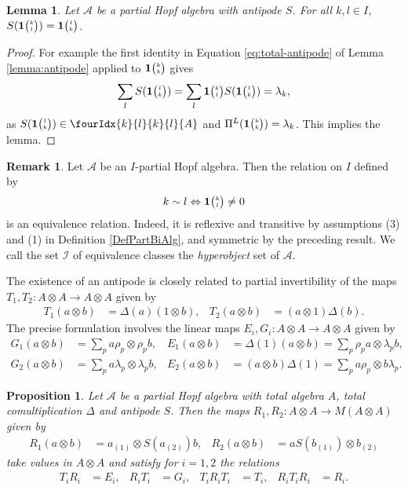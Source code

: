 \documentclass[11pt]{article}
\newcommand{\Grt}[3]{#1{\tiny {\begin{pmatrix} #2\\#3\end{pmatrix}}}}
\newcommand{\UnitC}[2]{\Grt{\mathbf{1}}{#1}{#2}}
\newcommand{\Gr}[5]{\fourIdx{#2}{#4}{#3}{#5}{#1}}%
\newtheorem{Lem}[Theorem]{Lemma}
\newtheorem{Prop}[Theorem]{Proposition}
\theoremstyle{definition}
\newtheorem{Rem}[Theorem]{Remark}
\numberwithin{equation}{section}
\begin{document}
\begin{Lem}\label{LemAntiUnit} Let $\mathscr{A}$ be a partial Hopf algebra with antipode $S$. For all $k,l\in I$, $S(\UnitC{k}{l}) = \UnitC{l}{k}$.
\end{Lem}
\begin{proof} For example the first identity in Equation \eqref{eq:total-antipode} of Lemma \ref{lemma:antipode} applied to $\UnitC{k}{k}$ gives \[\sum_l S(\UnitC{l}{k}) = \sum_l \UnitC{k}{l}S(\UnitC{l}{k}) = \lambda_k,\] as $S(\UnitC{l}{k}) \in \Gr{A}{k}{k}{l}{l}$ and $\Pi^{L}(\UnitC{k}{k}) = \lambda_k$. This implies the lemma.
\end{proof} 
\begin{Rem} \label{remark:index-equivalence}
  Let $\mathscr{A}$ be an $I$-partial Hopf algebra. Then the relation
  on $I$ defined by
  \begin{align*}
    k \sim l \Leftrightarrow \UnitC{k}{l} \neq 0
  \end{align*}
is an equivalence relation. Indeed, it is reflexive and transitive by
assumptions (3) and (1) in Definition \ref{DefPartBiAlg}, and
symmetric by the preceding result. We call the set $\mathscr{I}$ of equivalence classes the \emph{hyperobject} set of $\mathscr{A}$. %
\end{Rem}
The existence of an antipode is closely related to partial invertibility of
the maps $T_{1},T_{2} \colon A \otimes A \to A\otimes A$ given by
\begin{align} \label{eq:wt-12}
  T_{1} (a\otimes b)&= \Delta(a)(1 \otimes b), &
  T_{2} (a\otimes b)&= (a \otimes 1)\Delta(b).
 \end{align}
The precise formulation involves the linear maps $E_{i},G_{i}
 \colon A\otimes A\to A\otimes A$ given by
\begin{align} \label{eq:e1g1}
  G_{1}(a\otimes b) &=
 \sum_{p} a\rho_{p} \otimes \rho_{p}b, &  E_{1}(a \otimes b) &=\Delta(1)(a\otimes b)=\sum_{p} \rho_{p}a\otimes \lambda_{p}b, \\ \label{eq:e2g2}
 G_{2}(a \otimes b) &= \sum_{p} a\lambda_{p} \otimes
    \lambda_{p}b, &
E_{2}(a\otimes b) &= (a\otimes b)\Delta(1)=\sum_{p} a\rho_{p} \otimes b\lambda_{p}.
\end{align}
\begin{Prop} \label{prop:riti}
  Let $\mathscr{A}$ be a partial Hopf algebra with total algebra $A$,
  total comultiplication $\Delta$ and antipode  $S$. Then the maps
  $R_{1},R_{2} \colon A \otimes A \to M(A \otimes A)$ given by
  \begin{align*}
    R_{1}(a \otimes b) &= a_{(1)}\otimes S(a_{(2)})b, &
    R_{2}(a\otimes b) &= aS(b_{(1)})\otimes b_{(2)}
  \end{align*}
  take values in $A\otimes A$ and satisfy for $i=1,2$ the relations
  \begin{align} \label{eq:riti}
    T_{i}R_{i}&=E_{i}, & R_{i}T_{i}&= G_{i}, & T_{i}R_{i}T_{i}&= T_{i}, & R_{i}T_{i}R_{i} &= R_{i}.
  \end{align}
\end{Prop}
\end{document}
